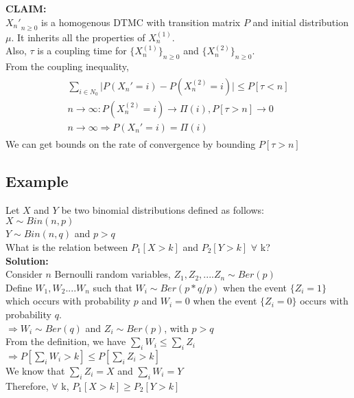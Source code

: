 \documentclass[a4paper,10pt]{article}
\theoremstyle{plain}
\theoremstyle{definition}
\theoremstyle{remark}
\begin{document}
\textbf{CLAIM:}\\
${X_n'}_{n \geq 0}$ is a homogenous DTMC with transition matrix $P$ and initial distribution $\mu$. It inherits all the properties of $X_n^{(1)}$.\\
Also, $\tau$ is a coupling time for $\{X_n^{(1)}\}_{n \geq 0}$ and $\{X_n^{(2)}\}_{n \geq 0}$.\\
From the coupling inequality,\\
\begin{eqnarray*}
\begin{aligned}
 \sum_{i \in N_0} \lvert P(X_n' = i) - P(X_n^{(2)} = i) \rvert \leq P[\tau < n]\\
 n \longrightarrow \infty:  P(X_n^{(2)} = i) \longrightarrow \Pi(i),  P[\tau > n] \longrightarrow 0\\
 n \longrightarrow \infty \Rightarrow P(X_n' = i) = \Pi(i) 
\end{aligned}
\end{eqnarray*}
We can get bounds on the rate of convergence by bounding $P[\tau > n]$

\subsection{Example}
Let $X$ and $Y$ be two binomial distributions defined as follows:\\
$X \sim Bin(n,p)$\\
$Y \sim Bin(n,q)$ and $p > q$\\
What is the relation between $P_1[X > k]$ and $P_2[Y > k]$  $\forall$ k?\\
\textbf{Solution:}\\
Consider $n$ Bernoulli random variables, $Z_1,Z_2,....Z_n \sim Ber(p)$\\
Define $W_1,W_2....W_n$ such that $W_i \sim Ber(p*q/p)$ when the event $\{Z_i = 1\}$ which occurs with probability $p$ and $W_i = 0$ when the event $\{Z_i = 0\}$
occurs with probability $q$.\\
$\Rightarrow W_i \sim Ber(q)$ and $Z_i \sim Ber(p)$, with $p > q$ \\
From the definition, we have $\sum_i W_i \leq \sum_i Z_i $\\
$\Rightarrow P[\sum_i W_i > k] \leq  P[\sum_i Z_i > k]$\\
We know that $\sum_i Z_i = X$ and $\sum_i W_i = Y$\\
Therefore, $\forall$ k, $P_1[X > k] \geq P_2[Y>k]$\\
\end{document}
